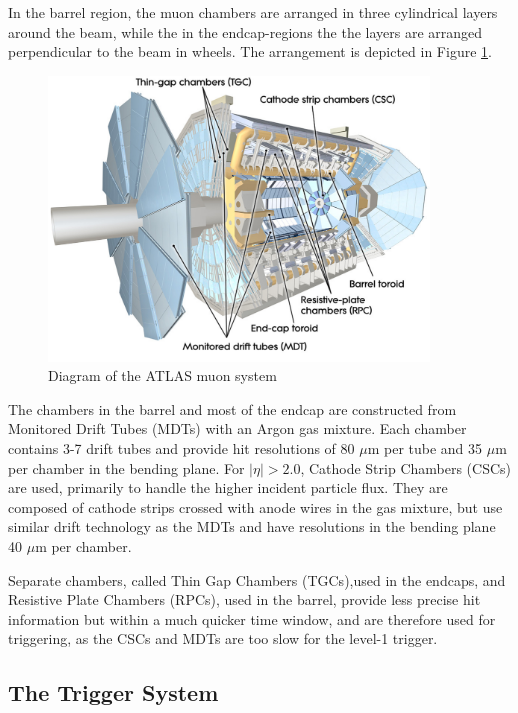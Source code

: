 In the barrel region, the muon chambers are arranged in three cylindrical layers around the beam, while the in the endcap-regions the the layers are arranged perpendicular to the beam in wheels. The arrangement is depicted in Figure \ref{figure:lhc_muon}.

\begin{figure}
\centering 
\includegraphics[width=0.9\textwidth]{figs/lhc/MuonSystem-eps-converted-to}
\caption{Diagram of the ATLAS muon system}
\label{figure:lhc_muon}
\end{figure}

The chambers in the barrel and most of the endcap are constructed from Monitored Drift Tubes (MDTs) with an Argon gas mixture. Each chamber contains 3-7 drift tubes and provide hit resolutions of 80 $\mu$m per tube and 35 $\mu$m per chamber in the bending plane. For $|\eta| > 2.0$, Cathode Strip Chambers (CSCs) are used, primarily to handle the higher incident particle flux. They are composed of cathode strips crossed with anode wires in the gas mixture, but use similar drift technology as the MDTs and have resolutions in the bending plane 40 $\mu$m per chamber. 

Separate chambers, called Thin Gap Chambers (TGCs),used in the endcaps, and Resistive Plate Chambers (RPCs), used in the barrel, provide less precise hit information but within a much quicker time window, and are therefore used for triggering, as the CSCs and MDTs are too slow for the level-1 trigger.


\subsection{The Trigger System} 


